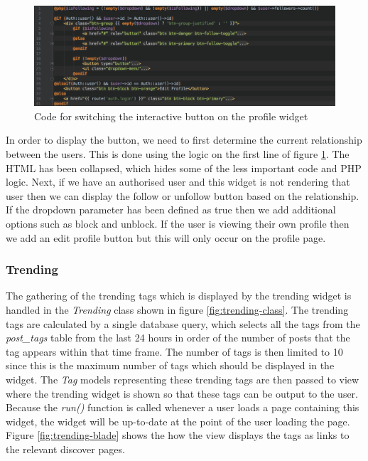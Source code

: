 \begin{figure}[H]
    \centering
    \includegraphics[width=\textwidth]{Images/Implementation/UI/Widgets/Profile_Follow}
    \caption{Code for switching the interactive button on the profile widget}
    \label{fig:Profile_Follow}
\end{figure}

In order to display the button, we need to first determine the current relationship between the users. This is done using the logic on the first line of figure \ref{fig:Profile_Follow}. The HTML has been collapsed, which hides some of the less important code and PHP logic. Next, if we have an authorised user and this widget is not rendering that user then we can display the follow or unfollow button based on the relationship. If the dropdown parameter has been defined as true then we add additional options such as block and unblock. If the user is viewing their own profile then we add an edit profile button but this will only occur on the profile page.

\subsubsection{Trending}
The gathering of the trending tags which is displayed by the trending widget is handled in the \emph{Trending} class shown in figure \ref{fig:trending-class}. The trending tags are calculated by a single database query, which selects all the tags from the \emph{post\_tags} table from the last 24 hours in order of the number of posts that the tag appears within that time frame. The number of tags is then limited to 10 since this is the maximum number of tags which should be displayed in the widget. The \emph{Tag} models representing these trending tags are then passed to view where the trending widget is shown so that these tags can be output to the user. Because the \textit{run()} function is called whenever a user loads a page containing this widget, the widget will be up-to-date at the point of the user loading the page. Figure \ref{fig:trending-blade} shows the how the view displays the tags as links to the relevant discover pages.

